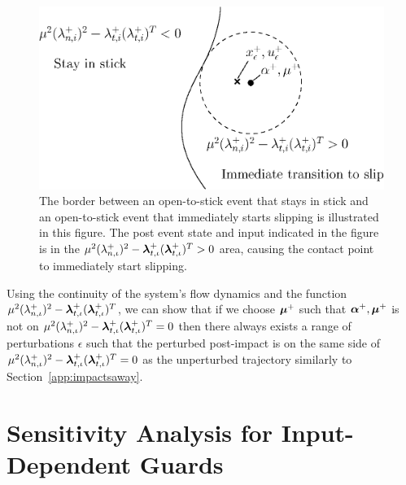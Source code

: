 \documentclass[../DC2017114Bouma.tex]{subfiles}
\begin{document}
\begin{figure}[h]
\centering
\includegraphics[width=.55\textwidth]{stickimmedslip.eps}\caption{The border between an open-to-stick event that stays in stick and an open-to-stick event that immediately starts slipping is illustrated in this figure. The post event state and input indicated in the figure is in the $\mu^2(\lambda^+_{n,\iota})^2 - \boldsymbol{\lambda}^+_{t,\iota}(\boldsymbol{\lambda}^+_{t,\iota})^T > 0$ area, causing the contact point to immediately start slipping.} \label{fig:stickimmedslip}
\end{figure}

Using the continuity of the system's flow dynamics and the function $\mu^2(\lambda^+_{n,\iota})^2 - \boldsymbol{\lambda}^+_{t,\iota}(\boldsymbol{\lambda}^+_{t,\iota})^T$, we can show that if we choose $\boldsymbol{\mu}^+$ such that $\boldsymbol{\alpha}^+,\boldsymbol{\mu}^+$ is not on $\mu^2(\lambda^+_{n,\iota})^2 - \boldsymbol{\lambda}^+_{t,\iota}(\boldsymbol{\lambda}^+_{t,\iota})^T = 0$ then there always exists a range of perturbations $\epsilon$ such that the perturbed post-impact is on the same side of $\mu^2(\lambda^+_{n,\iota})^2 - \boldsymbol{\lambda}^+_{t,\iota}(\boldsymbol{\lambda}^+_{t,\iota})^T = 0$ as the unperturbed trajectory similarly to Section~\ref{app:impactsaway}.

\pagestyle{fancyreport}
\cleartooddpage
\pagestyle{fancyreport}
\chapter{Sensitivity Analysis for Input-Dependent Guards}\label{app:Csensitivity}
\end{document}
